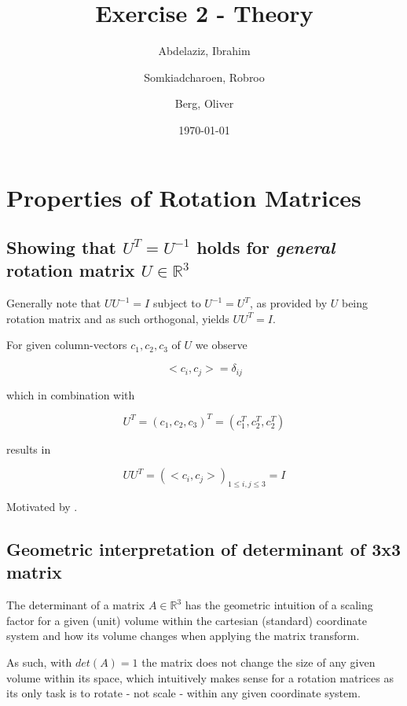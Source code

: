\documentclass[a4paper, twoside, english]{article}
\title{Exercise 2 - Theory}
\author{
	Abdelaziz, Ibrahim
	\and
	Somkiadcharoen, Robroo
	\and
	Berg, Oliver
}
\date{\today}
\begin{document}
\maketitle


\section{Properties of Rotation Matrices}

\subsection{Showing that $U^T = U^{-1}$ holds for \textit{general} rotation matrix $U \in \mathbb{R}^3$}

Generally note that $UU^{-1}=I$ subject to $U^{-1} = U^T$, as provided by $U$ being rotation matrix and as such orthogonal, yields $UU^T = I$.

For given column-vectors $c_1, c_2, c_3$ of $U$ we observe 

\begin{equation*}
	<c_i, c_j> = \delta_{i j}
\end{equation*}

which in combination with

\begin{equation*}
	U^T = (c_1, c_2, c_3)^T = (c_1^T, c_2^T, c_2^T)
\end{equation*}

results in

\begin{equation*}
	UU^T = (<c_i, c_j>)_{1 \le i, j \le 3} = I
\end{equation*}

Motivated by \cite{MathematicsSEMatrixTransposeIdentity}\cite{MathematicsSEMatrixTransposeIdentity2}\cite{WikiOrthogonaleMatrix}.

\subsection{Geometric interpretation of determinant of 3x3 matrix}

The determinant of a matrix $A \in \mathbb{R}^3$ has the geometric intuition of a scaling factor for a given (unit) volume within the cartesian (standard) coordinate system and how its volume changes when applying the matrix transform. \cite{3blue1brownLinAlg5Determinant}

As such, with $det(A) = 1$ the matrix does not change the size of any given volume within its space, which intuitively makes sense for a rotation matrices as its only task is to rotate - not scale - within any given coordinate system.
\end{document}
